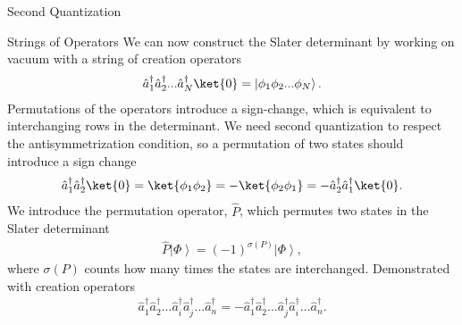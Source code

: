 \documentclass[twoside,english]{uiofysmaster}
\begin{document}
\begin{chapter}{Second Quantization}
	\begin{section}{Strings of Operators}
		We can now construct the Slater determinant by working on vacuum with a string of creation operators
		\begin{align}
			\hat a_1^{\dagger} \hat a_2^{\dagger}... \hat a_N^{\dagger} \ket{0} = \left| \phi_1 \phi_2 ... \phi_N \right> .
		\end{align}
		Permutations of the operators introduce a sign-change, which is equivalent to interchanging rows in the determinant. We need second quantization to respect the antisymmetrization condition, so a permutation of two states should introduce a sign change 
		\begin{align}
			\hat a_1^{\dagger} \hat a_2^{\dagger} \ket{0} = \ket{\phi_1 \phi_2} = -\ket{\phi_2 \phi_1} = -\hat a_2^{\dagger} \hat a_1^{\dagger} \ket{0}.
		\end{align}
		We introduce the permutation operator, $\hat P$, which permutes two states in the Slater determinant 
		\begin{align}
			\hat P \left| \Phi \right> = (-1)^{\sigma(P)} \left| \Phi \right>,
		\end{align}
		where $\sigma(P)$ counts how many times the states are interchanged. Demonstrated with creation operators
		\begin{align}
			\hat a_1^\dagger \hat a_2^\dagger ... \hat a_i^\dagger \hat a_j^\dagger ... \hat a_n^\dagger = - \hat a_1^\dagger \hat a_2^\dagger ... \hat a_j^\dagger \hat a_i^\dagger ... \hat a_n^\dagger.
		\end{align}
	\end{section}


\end{chapter}
\end{document}
